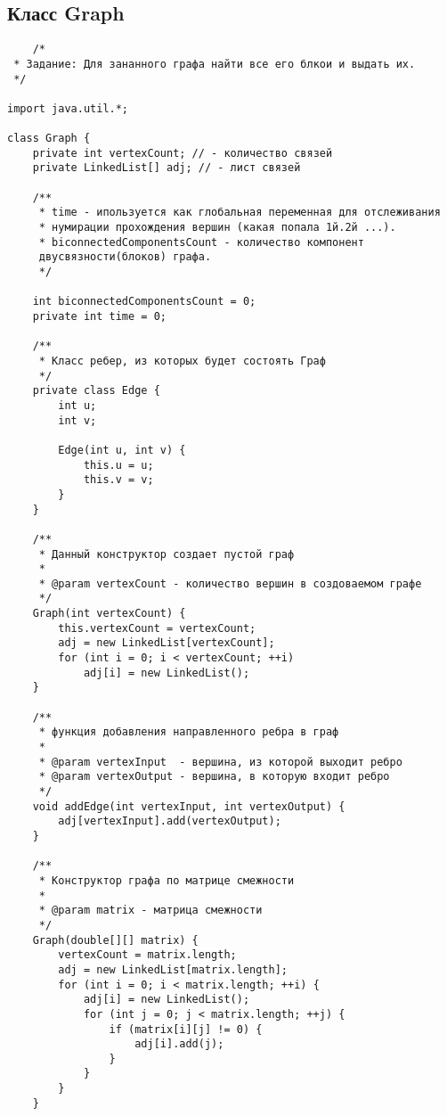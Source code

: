 \subsection{Класс Graph}
	\begin{verbatim}
	/*
 * Задание: Для зананного графа найти все его блкои и выдать их.
 */

import java.util.*;

class Graph {
    private int vertexCount; // - количество связей
    private LinkedList[] adj; // - лист связей

    /**
     * time - ипользуется как глобальная переменная для отслеживания
     * нумирации прохождения вершин (какая попала 1й.2й ...).
     * biconnectedComponentsCount - количество компонент
     двусвязности(блоков) графа.
     */

    int biconnectedComponentsCount = 0;
    private int time = 0;

    /**
     * Класс ребер, из которых будет состоять Граф
     */
    private class Edge {
        int u;
        int v;

        Edge(int u, int v) {
            this.u = u;
            this.v = v;
        }
    }

    /**
     * Данный конструктор создает пустой граф
     *
     * @param vertexCount - количество вершин в создоваемом графе
     */
    Graph(int vertexCount) {
        this.vertexCount = vertexCount;
        adj = new LinkedList[vertexCount];
        for (int i = 0; i < vertexCount; ++i)
            adj[i] = new LinkedList();
    }

    /**
     * функция добавления направленного ребра в граф
     *
     * @param vertexInput  - вершина, из которой выходит ребро
     * @param vertexOutput - вершина, в которую входит ребро
     */
    void addEdge(int vertexInput, int vertexOutput) {
        adj[vertexInput].add(vertexOutput);
    }

    /**
     * Конструктор графа по матрице смежности
     *
     * @param matrix - матрица смежности
     */
    Graph(double[][] matrix) {
        vertexCount = matrix.length;
        adj = new LinkedList[matrix.length];
        for (int i = 0; i < matrix.length; ++i) {
            adj[i] = new LinkedList();
            for (int j = 0; j < matrix.length; ++j) {
                if (matrix[i][j] != 0) {
                    adj[i].add(j);
                }
            }
        }
    }


\end{verbatim}
